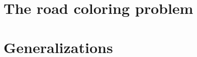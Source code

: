 \documentclass{irmaart}
\begin{document}
\section{The road coloring problem}
\label{KV:sec:rcp}

\section{Generalizations}


\begin{footnotesize}
  
\end{footnotesize}


\markright{\indexname}\markboth{\indexname}{\indexname}
\printindex
\end{document}
